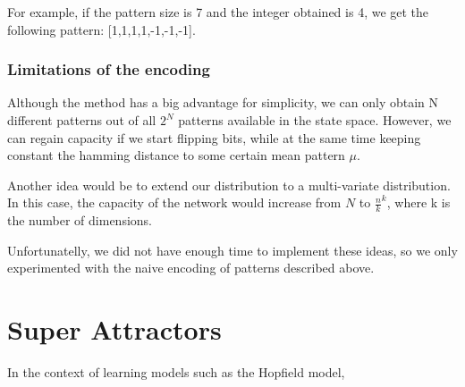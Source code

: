 For example, if the pattern size is 7 and the integer obtained is 4, we get the following pattern: [1,1,1,1,-1,-1,-1]. 

\subsubsection{Limitations of the encoding}

Although the method has a big advantage for simplicity, we can only obtain N different patterns out of all \( 2^N\) patterns available in the state space. However, we can regain capacity if we start flipping bits, while at the same time keeping constant the hamming distance to some certain mean pattern \(\mu\).

Another idea would be to extend our distribution to a multi-variate distribution. In this case, the capacity of the network would increase from \(N\) to \(\frac{n}{k}^k\), where k is the number of dimensions. 

Unfortunatelly, we did not have enough time to implement these ideas, so we only experimented with the naive encoding of patterns described above. 

\section{Super Attractors}
In the context of learning models such as the Hopfield model,

